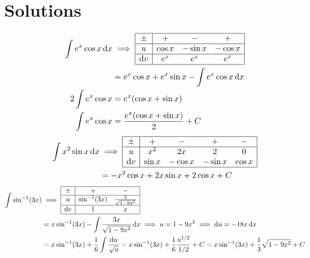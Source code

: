 \documentclass{article}
\begin{document}
		\section*{Solutions}
			\begin{tasks}[style = enumerate]
				\task
					\begin{align*}
						\int e^x \cos x \dd{x} &\implies
								\begin{array}{|c|ccc|}\hline
									\pm & + & - & + \\\hline
									u & \cos x & -\sin x & -\cos x \\\hline
									\dd{v} & e^x & e^x & e^x\\\hline
								\end{array} \\
							&= e^x\cos x + e^x\sin x - \int e^x\cos x \dd{x} \\
						2\int e^x\cos x &= e^x(\cos x + \sin x) \\
						\int e^x \cos x &= \frac{e^x(\cos x + \sin x)}{2} + C
					\end{align*}
				\task
					\begin{align*}
						\int x^2\sin x \dd{x} &\implies
								\begin{array}{|c|cccc|}\hline
									\pm & + & - & + & - \\\hline
									u & x^2 & 2x & 2 & 0 \\
									\dd{v} & \sin x & -\cos x & -\sin x & \cos x \\\hline
								\end{array} \\
							&= -x^2\cos x + 2x\sin x + 2\cos x + C
					\end{align*}
				\task
					\begin{align*}
						\int \sin^{-1}(3x) &\implies
								\begin{array}{|c|cc|}\hline
									\pm & + & - \\\hline
									u & \sin^{-1}(3x) & \frac{3}{\sqrt{1 - 9x^2}} \\\hline
									\dd{v} & 1 & x \\\hline
								\end{array} \\
							&= x\sin^{-1}(3x) - \int \frac{3x}{\sqrt{1 - 9x^2}} \dd{x}
								\implies u = 1 - 9x^2
								\implies \dd{u} = -18x\dd{x} \\
							&= x\sin^{-1}(3x) + \frac{1}{6}\int \frac{\dd{u}}{\sqrt{u}}
								= x\sin^{-1}(3x) + \frac{1}{6}\frac{u^{1/2}}{1/2} + C
								= x\sin^{-1}(3x) + \frac{1}{3}\sqrt{1 - 9x^2} + C

\end{align*}
\end{tasks}
\end{document}
